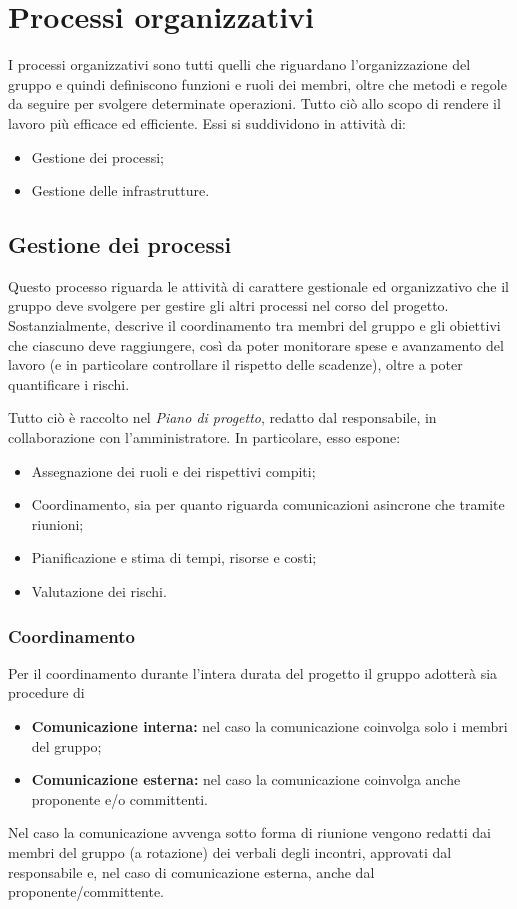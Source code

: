 \newpage
\section{Processi organizzativi}\label{sec:processi_organizzativi}
I processi organizzativi sono tutti quelli che riguardano l’organizzazione del gruppo e quindi definiscono funzioni e ruoli dei membri, oltre che metodi e regole da seguire per svolgere determinate operazioni.
Tutto ciò allo scopo di rendere il lavoro più efficace ed efficiente.
Essi si suddividono in attività di:
\begin{itemize}
    \item Gestione dei processi;
    \item Gestione delle infrastrutture.
\end{itemize}


\subsection{Gestione dei processi}\label{sec:processi_organizzativi:gestione_processi}
Questo processo riguarda le attività di carattere gestionale ed organizzativo che il gruppo deve svolgere per gestire gli altri processi nel corso del progetto. Sostanzialmente, descrive il coordinamento tra membri del gruppo e gli obiettivi che ciascuno deve raggiungere, così da poter monitorare spese e avanzamento del lavoro (e in particolare controllare il rispetto delle scadenze), oltre a poter quantificare i rischi.

Tutto ciò è raccolto nel \textit{Piano di progetto},
redatto dal responsabile, in collaborazione con l'amministratore. In particolare, esso espone:
\begin{itemize}
    \item Assegnazione dei ruoli e dei rispettivi compiti;
    \item Coordinamento, sia per quanto riguarda comunicazioni asincrone che tramite riunioni;
    \item Pianificazione e stima di tempi, risorse e costi;
    \item Valutazione dei rischi.
\end{itemize}

\subsubsection{Coordinamento}
Per il coordinamento durante l’intera durata del progetto il gruppo adotterà sia procedure di
\begin{itemize}
    \item \textbf{Comunicazione interna:} nel caso la comunicazione coinvolga solo i membri del gruppo;
    \item \textbf{Comunicazione esterna:} nel caso la comunicazione coinvolga anche proponente e/o committenti.
\end{itemize}
Nel caso la comunicazione avvenga sotto forma di riunione vengono redatti dai membri del gruppo (a rotazione) dei verbali degli incontri, approvati dal responsabile e, nel caso di comunicazione esterna, anche dal proponente/committente.

